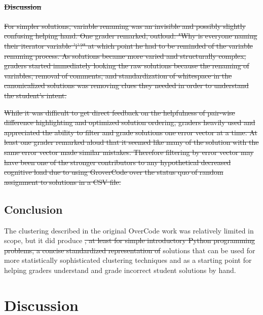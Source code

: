 \documentclass[12pt,twoside]{mitthesis}
\providecommand{\DIFaddtex}[1]{{\protect\color{blue}\uwave{#1}}} %
\providecommand{\DIFdeltex}[1]{{\protect\color{red}\sout{#1}}}                      %
\providecommand{\DIFaddbegin}{} %
\providecommand{\DIFaddend}{} %
\providecommand{\DIFdelbegin}{} %
\providecommand{\DIFdelend}{} %
\providecommand{\DIFadd}[1]{\texorpdfstring{\DIFaddtex{#1}}{#1}} %
\providecommand{\DIFdel}[1]{\texorpdfstring{\DIFdeltex{#1}}{}} %
\begin{document}
{{{{{{{{{{%
\subsubsection{\DIFdel{Discussion}}
\addtocounter{subsubsection}{-1}%
\DIFdel{For simpler solutions, variable renaming was an invisible and possibly slightly confusing helping hand. One grader remarked, outloud: "Why is everyone naming their iterator variable 'i'?" at which point he had to be reminded of the variable renaming process. As solutions became more varied and structurally complex, graders started immediately looking the raw solutions because the renaming of variables, removal of comments, and standardization of whitespace in the canonicalized solutions was removing clues they needed in order to understand the student's intent.
}%

\DIFdel{While it was difficult to get direct feedback on the helpfulness of pair-wise difference highlighting and optimized solution ordering, graders heavily used and appreciated the ability to filter and grade solutions one error vector at a time. At least one grader remarked aloud that it seemed like many of the solution with the same error vector made similar mistakes. Therefore filtering by error vector may have been one of the stronger contributors to any hypothetical decreased cognitive load due to using GroverCode over the status quo of random assignment to solutions in a CSV file.
}%


\DIFdelend \section{Conclusion}
The clustering described in the original OverCode work was relatively limited in scope, but it did produce \DIFdelbegin \DIFdel{, at least for simple introductory Python programming problems, a concise standardized representation of }\DIFdelend \DIFaddbegin \DIFadd{platonic }\DIFaddend solutions that can be used for more statistically sophisticated clustering techniques and as a starting point for helping graders understand and grade incorrect student solutions by hand.


\chapter{Discussion}\label{chapter:discussion}

}}}}}}}}}}
\end{document}
